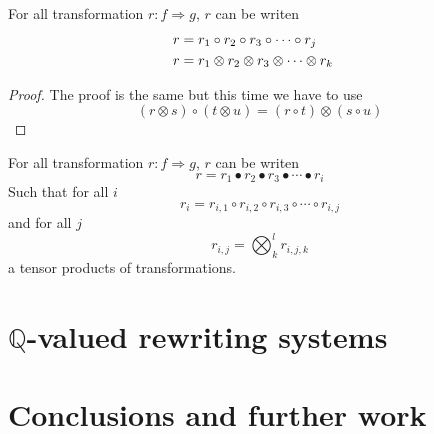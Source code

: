 \documentclass[a4paper]{article}
\begin{document}
\begin{proposition}
For all transformation $r: f \Rightarrow g$, $r$ can be writen
\begin{align}
r &= r_1 \circ r_2 \circ r_3 \circ \cdots \circ r_j \cr
r &= r_1 \otimes r_2 \otimes r_3 \otimes \cdots \otimes r_k
\end{align}

\begin{proof}
The proof is the same but this time we have to use
\[
(r \otimes s) \circ (t \otimes u) = (r \circ t) \otimes (s \circ u)
\]
\end{proof}
\end{proposition}

\begin{corollary}
For all transformation $r: f \Rightarrow g$, $r$ can be writen
\[
r = r_1 \bullet r_2 \bullet r_3 \bullet \cdots \bullet r_i
\]
Such that for all $i$
\[
r_i = r_{i, 1} \circ r_{i, 2} \circ r_{i, 3} \circ \cdots \circ r_{i, j}
\]
and for all $j$
\[
r_{i, j} = \bigotimes_k^l r_{i, j, k}
\]
a tensor products of transformations.
\end{corollary}




\section{$\mathbb{Q}$-valued rewriting systems}

\section{Conclusions and further work}
\label{sec:conclusion}



\small

\end{document}
